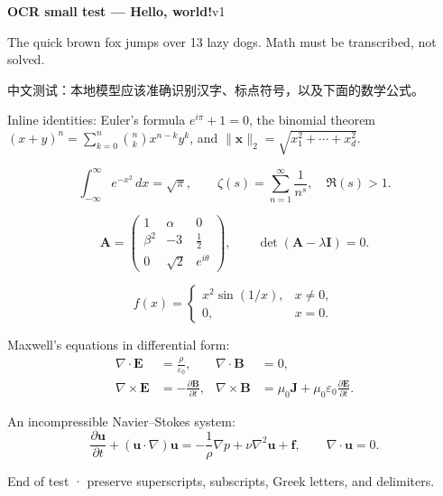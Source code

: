 \documentclass[11pt]{article}
\begin{document}
{\LARGE\bfseries OCR small test — Hello, world!}\hfill {\small v1}

The quick brown fox jumps over 13 lazy dogs.  Math must be transcribed, not solved.

中文测试：本地模型应该准确识别汉字、标点符号，以及下面的数学公式。

Inline identities: Euler's formula $e^{i\pi}+1=0$, the binomial theorem
$(x+y)^n=\sum_{k=0}^{n}\binom{n}{k}x^{n-k}y^k$, and
$\lVert \bm{x}\rVert_2=\sqrt{x_1^2+\cdots+x_d^2}$.

\begin{equation}
  \int_{-\infty}^{\infty} e^{-x^2}\,dx=\sqrt{\pi},\qquad
  \zeta(s)=\sum_{n=1}^{\infty}\frac{1}{n^s},\quad \Re(s)>1.
\end{equation}

\begin{equation}
  \mathbf{A}=
  \begin{pmatrix}
    1 & \alpha & 0\\
    \beta^2 & -3 & \tfrac{1}{2}\\
    0 & \sqrt{2} & e^{i\theta}
  \end{pmatrix},\qquad
  \det(\mathbf{A}-\lambda\mathbf{I})=0.
\end{equation}

\begin{equation}
  f(x)=
  \begin{cases}
    x^2\sin(1/x), & x\neq 0,\\
    0, & x=0.
  \end{cases}
\end{equation}

Maxwell's equations in differential form:
\begin{align}
  \nabla\cdot\mathbf{E}&=\frac{\rho}{\varepsilon_0}, &
  \nabla\cdot\mathbf{B}&=0,\\
  \nabla\times\mathbf{E}&=-\frac{\partial\mathbf{B}}{\partial t}, &
  \nabla\times\mathbf{B}&=\mu_0\mathbf{J}+\mu_0\varepsilon_0
  \frac{\partial\mathbf{E}}{\partial t}.
\end{align}

An incompressible Navier--Stokes system:
\begin{equation}
  \frac{\partial\mathbf{u}}{\partial t}
  +(\mathbf{u}\cdot\nabla)\mathbf{u}
  =-\frac{1}{\rho}\nabla p+\nu\nabla^2\mathbf{u}+\mathbf{f},
  \qquad \nabla\cdot\mathbf{u}=0.
\end{equation}

\begin{center}
\small End of test · preserve superscripts, subscripts, Greek letters, and delimiters.
\end{center}
\end{document}
